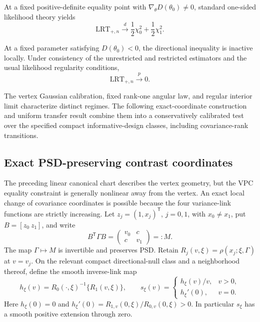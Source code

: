 At a fixed positive-definite equality point with
$\nabla_\theta D(\theta_0)\neq 0$, standard one-sided
likelihood theory yields
\begin{equation}
\mathrm{LRT}_{+,n}
\xrightarrow{d}
\frac{1}{2}\chi_0^2
+
\frac{1}{2}\chi_1^2.
\label{eq:directional-interior-limit}
\end{equation}

At a fixed parameter satisfying $D(\theta_0)<0$,
the directional inequality is inactive locally.
Under consistency of the unrestricted and restricted
estimators and the usual likelihood regularity
conditions,
\begin{equation}
\mathrm{LRT}_{+,n}
\xrightarrow{p}
0.
\label{eq:directional-strict-null-limit}
\end{equation}

The vertex Gaussian calibration, fixed rank-one angular law,
and regular interior limit characterize distinct regimes.
The following exact-coordinate construction and uniform transfer
result combine them into a conservatively calibrated test over
the specified compact informative-design classes, including
covariance-rank transitions.


\subsection{Exact PSD-preserving contrast coordinates}
\label{subsec:sec7-exact-chart}

The preceding linear canonical chart describes the vertex geometry,
but the VPC equality constraint is generally nonlinear away from the
vertex. An exact local change of covariance coordinates is possible
because the four variance-link functions are strictly increasing.
Let $z_j=(1,x_j)^{\mathsf T}$, $j=0,1$, with $x_0\ne x_1$,
put $B=[z_0\ z_1]$, and write
\begin{equation}\label{eq:sec7-twolevel-cov}
 B^{\mathsf T}\Gamma B=\begin{pmatrix}v_0&c\\c&v_1\end{pmatrix}=:M.
\end{equation}
The map $\Gamma\mapsto M$ is invertible and preserves PSD.
Retain $R_j(v,\xi)=\rho(x_j;\xi,\Gamma)$ at $v=v_j$.
On the relevant compact directional-null class and a neighborhood
thereof, define the smooth inverse-link map
\begin{equation}\label{eq:sec7-hlink}
 h_\xi(v)=R_0(\cdot,\xi)^{-1}\{R_1(v,\xi)\},\qquad
 s_\xi(v)=\begin{cases}
 h_\xi(v)/v,&v>0,\\
 h_\xi'(0),&v=0.
 \end{cases}
\end{equation}
Here $h_\xi(0)=0$ and
$h_\xi'(0)=R_{1,v}(0,\xi)/R_{0,v}(0,\xi)>0$.
In particular $s_\xi$ has a smooth positive extension through zero.

